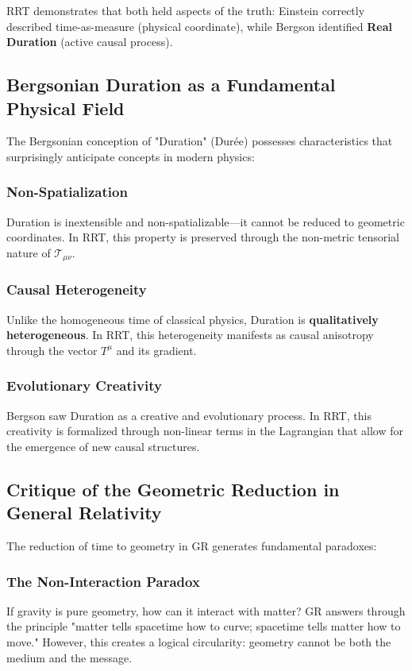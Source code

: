 \documentclass[12pt,a4paper]{article}
\begin{document}
RRT demonstrates that both held aspects of the truth: Einstein correctly described time-as-measure (physical coordinate), while Bergson identified \textbf{Real Duration} (active causal process).

\subsection{Bergsonian Duration as a Fundamental Physical Field}
The Bergsonian conception of "Duration" (Durée) possesses characteristics that surprisingly anticipate concepts in modern physics:

\subsubsection{Non-Spatialization}
Duration is inextensible and non-spatializable—it cannot be reduced to geometric coordinates. In RRT, this property is preserved through the non-metric tensorial nature of $\mathcal{T}_{\mu\nu}$.

\subsubsection{Causal Heterogeneity}
Unlike the homogeneous time of classical physics, Duration is \textbf{qualitatively heterogeneous}. In RRT, this heterogeneity manifests as causal anisotropy through the vector $T^\mu$ and its gradient.

\subsubsection{Evolutionary Creativity}
Bergson saw Duration as a creative and evolutionary process. In RRT, this creativity is formalized through non-linear terms in the Lagrangian that allow for the emergence of new causal structures.

\subsection{Critique of the Geometric Reduction in General Relativity}
The reduction of time to geometry in GR generates fundamental paradoxes:

\subsubsection{The Non-Interaction Paradox}
If gravity is pure geometry, how can it interact with matter? GR answers through the principle "matter tells spacetime how to curve; spacetime tells matter how to move." However, this creates a logical circularity: geometry cannot be both the medium and the message.
\end{document}
